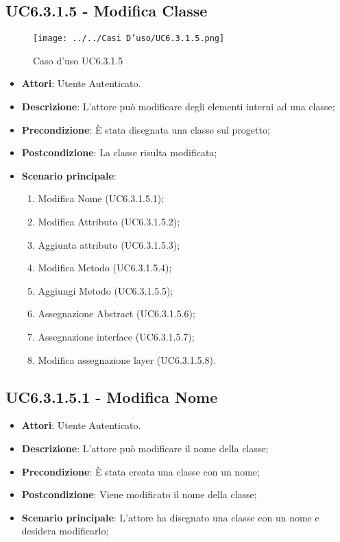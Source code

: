 \subsection{UC6.3.1.5 - Modifica Classe} 
\label{ssec:UC6.3.1.5} 
\begin{figure}[h!] 
\centering 
\texttt{[image: ../../Casi D'uso/UC6.3.1.5.png]} 
\caption{Caso d'uso UC6.3.1.5} 
 \end{figure} 
\begin{itemize} 
\item \textbf{Attori}: Utente Autenticato.
\item \textbf{Descrizione}: L'attore può modificare degli elementi interni ad una classe;
\item \textbf{Precondizione}: È stata disegnata una classe sul progetto;
\item \textbf{Postcondizione}: La classe risulta modificata;
\item \textbf{Scenario principale}: \begin{enumerate}\item Modifica Nome (UC6.3.1.5.1);\item Modifica Attributo (UC6.3.1.5.2);\item Aggiunta attributo (UC6.3.1.5.3);\item Modifica Metodo (UC6.3.1.5.4);\item Aggiungi Metodo (UC6.3.1.5.5);\item Assegnazione Abstract (UC6.3.1.5.6);\item Assegnazione interface (UC6.3.1.5.7);\item Modifica assegnazione layer (UC6.3.1.5.8). 
 \end{enumerate}
\end{itemize} 
\subsection{UC6.3.1.5.1 - Modifica Nome} 
\label{ssec:UC6.3.1.5.1} 
\begin{itemize} 
\item \textbf{Attori}: Utente Autenticato.
\item \textbf{Descrizione}: L'attore può modificare il nome della classe;
\item \textbf{Precondizione}: È stata creata una classe con un nome;
\item \textbf{Postcondizione}: Viene modificato il nome della classe;
\item \textbf{Scenario principale}: L'attore ha disegnato una classe con un nome e desidera modificarlo;\end{itemize} 
